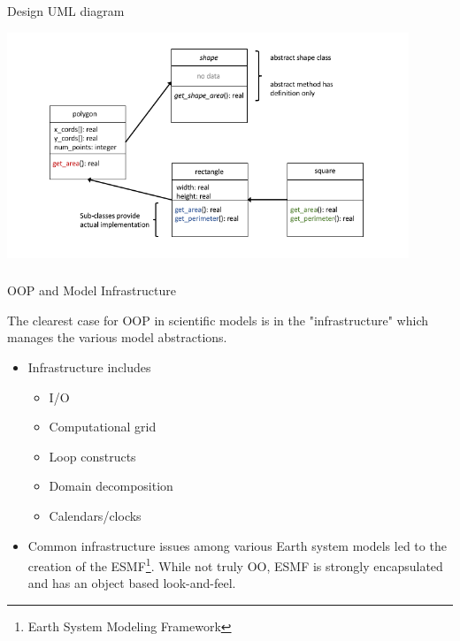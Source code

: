 \documentclass[11pt]{beamer}
\begin{document}

\begin{frame}{Design} 
UML diagram
\begin{center} 
  \includegraphics[width=0.9\textwidth]{../../shared/shapes_uml.png} 
\end{center} 

\end{frame} 

\begin{frame}[fragile]
\frametitle{}



\end{frame}


\begin{frame}{OOP and Model Infrastructure}

The clearest case for OOP in scientific models is in the "infrastructure" which manages the various model abstractions.
\begin{itemize}

  \item Infrastructure includes
    \begin{itemize}
    \item I/O
    \item Computational grid
    \item Loop constructs
    \item Domain decomposition
    \item Calendars/clocks
    \end{itemize}

  \item Common infrastructure issues among various Earth system models led to the creation of the ESMF\footnote{Earth System Modeling Framework}. While not truly OO, ESMF is strongly encapsulated and has an object based look-and-feel.
  
 \end{itemize}

\end{frame}
\end{document}

